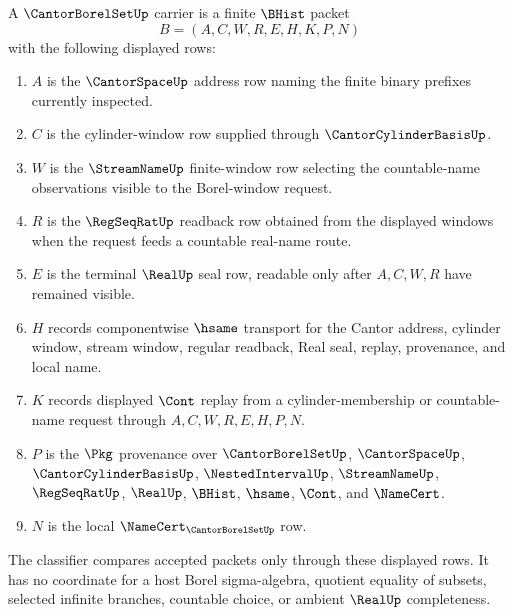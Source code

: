 \begin{definition}
\label{def:cantor-borel-set-carrier}
A $\CantorBorelSetUp$ carrier is a finite $\BHist$ packet
$$
B=(A,C,W,R,E,H,K,P,N)
$$
with the following displayed rows:
\begin{enumerate}
\item $A$ is the $\CantorSpaceUp$ address row naming the finite binary prefixes currently inspected.
\item $C$ is the cylinder-window row supplied through $\CantorCylinderBasisUp$.
\item $W$ is the $\StreamNameUp$ finite-window row selecting the countable-name observations visible to the Borel-window request.
\item $R$ is the $\RegSeqRatUp$ readback row obtained from the displayed windows when the request feeds a countable real-name route.
\item $E$ is the terminal $\RealUp$ seal row, readable only after $A,C,W,R$ have remained visible.
\item $H$ records componentwise $\hsame$ transport for the Cantor address, cylinder window, stream window, regular readback, Real seal, replay, provenance, and local name.
\item $K$ records displayed $\Cont$ replay from a cylinder-membership or countable-name request through $A,C,W,R,E,H,P,N$.
\item $P$ is the $\Pkg$ provenance over $\CantorBorelSetUp$, $\CantorSpaceUp$, $\CantorCylinderBasisUp$, $\NestedIntervalUp$, $\StreamNameUp$, $\RegSeqRatUp$, $\RealUp$, $\BHist$, $\hsame$, $\Cont$, and $\NameCert$.
\item $N$ is the local $\NameCert_{\CantorBorelSetUp}$ row.
\end{enumerate}
The classifier compares accepted packets only through these displayed rows. It has no coordinate for a host Borel sigma-algebra, quotient equality of subsets, selected infinite branches, countable choice, or ambient $\RealUp$ completeness.
\end{definition}

